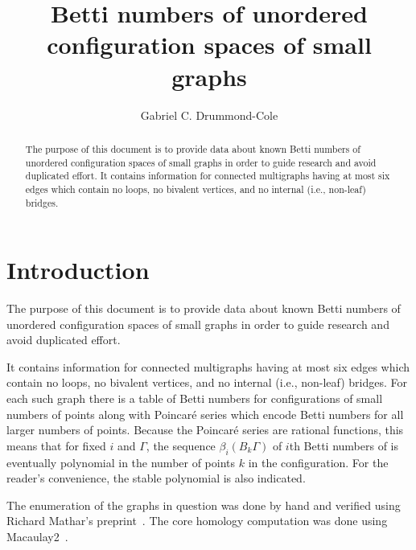 \documentclass{amsart}
\title{Betti numbers of unordered configuration spaces of small graphs}
\author{Gabriel C. Drummond-Cole}
\theoremstyle{definition}
\begin{document}
\begin{abstract}
The purpose of this document is to provide data about known Betti numbers of unordered configuration spaces of small graphs in order to guide research and avoid duplicated effort.
It contains information for connected multigraphs having at most six edges which contain no loops, no bivalent vertices, and no internal (i.e., non-leaf) bridges.
\end{abstract}
\maketitle
\section*{Introduction}
The purpose of this document is to provide data about known Betti numbers of unordered configuration spaces of small graphs in order to guide research and avoid duplicated effort.

It contains information for connected multigraphs having at most six edges which contain no loops, no bivalent vertices, and no internal (i.e., non-leaf) bridges.
For each such graph there is a table of Betti numbers for configurations of small numbers of points along with Poincar\'e series which encode Betti numbers for all larger numbers of points. 
Because the Poincar\'e series are rational functions, this means that for fixed $i$ and $\Gamma$, the sequence $\beta_i (B_k\Gamma)$ of $i$th Betti numbers of is eventually polynomial in the number of points $k$ in the configuration. 
For the reader's convenience, the stable polynomial is also indicated.

The enumeration of the graphs in question was done by hand and verified using Richard Mathar's preprint~\cite[Table 61]{Mathar:SSG}. 
The core homology computation was done using Macaulay2~\cite{GraysonStillman:M2}. 
\end{document}
